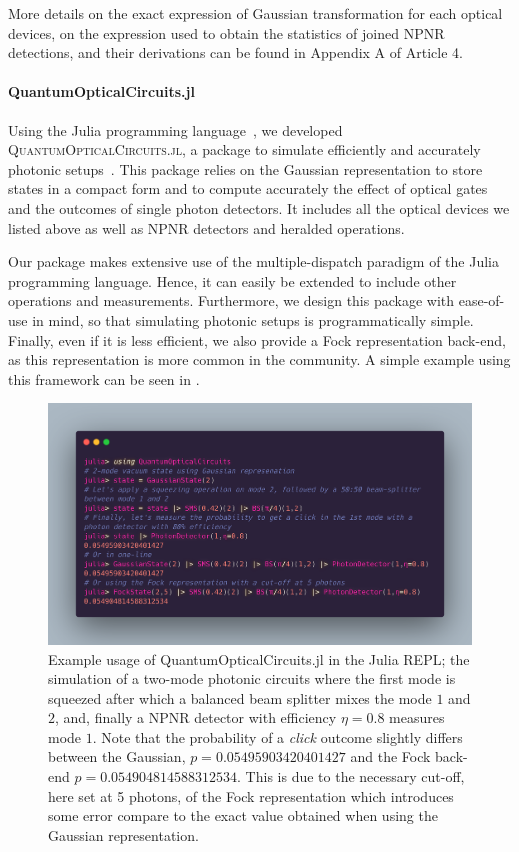 More details on the exact expression of Gaussian transformation for each optical devices, on the expression used to obtain the statistics of joined NPNR detections, and their derivations can be found in Appendix A of Article 4.

\paragraph{QuantumOpticalCircuits.jl}

Using the Julia programming language~\cite{Bezanson2017}, we developed \textsc{QuantumOpticalCircuits.jl}, a package to simulate efficiently and accurately photonic setups~\cite{Valcarce2021}.
This package relies on the Gaussian representation to store states in a compact form and to compute accurately the effect of optical gates and the outcomes of single photon detectors.
It includes all the optical devices we listed above as well as NPNR detectors and heralded operations.

Our package makes extensive use of the multiple-dispatch paradigm of the Julia programming language.
Hence, it can easily be extended to include other operations and measurements.
Furthermore, we design this package with ease-of-use in mind, so that simulating photonic setups is programmatically simple.
Finally, even if it is less efficient, we also provide a Fock representation back-end, as this representation is more common in the community.
A simple example using this framework can be seen in .

\begin{figure}
	\begin{center}
		\includegraphics[width=1\textwidth]{chapters/deviceindependent/img/quantumopticalcircuits.png}
	\end{center}
\caption{Example usage of QuantumOpticalCircuits.jl in the Julia REPL; the simulation of a two-mode photonic circuits where the first mode is squeezed after which a balanced beam splitter mixes the mode $1$ and $2$, and, finally a NPNR detector with efficiency $\eta=0.8$ measures mode $1$. Note that the probability of a \textit{click} outcome slightly differs between the Gaussian, $p=0.05495903420401427$ and the Fock back-end $p=0.054904814588312534$. This is due to the necessary cut-off, here set at 5 photons, of the Fock
representation which introduces some error compare to the exact value obtained when using the Gaussian representation.}
	\label{fig:QOC.jl}
\end{figure}


